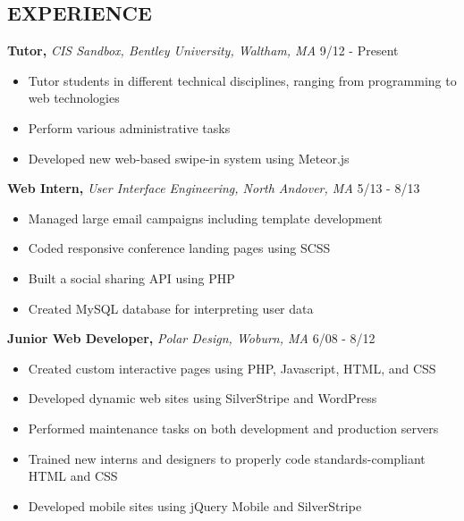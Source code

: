 \documentclass[line, margin]{res}
\begin{document}
\begin{resume}
 
\section{EXPERIENCE} 
\textbf{Tutor,} \textit{CIS Sandbox, Bentley University, Waltham, MA} \hfill 9/12 - Present
\begin{itemize}
    \item Tutor students in different technical disciplines, ranging from programming to web technologies
    \item Perform various administrative tasks
    \item Developed new web-based swipe-in system using Meteor.js
\end{itemize}
\textbf{Web Intern,} \textit{User Interface Engineering, North Andover, MA} \hfill 5/13 - 8/13
\begin{itemize}
    \item Managed large email campaigns including template development
    \item Coded responsive conference landing pages using SCSS
    \item Built a social sharing API using PHP
    \item Created MySQL database for interpreting user data
\end{itemize}
\textbf{Junior Web Developer,} \textit{Polar Design, Woburn, MA} \hfill 6/08 - 8/12
\begin{itemize}
    \item Created custom interactive pages using PHP, Javascript, HTML, and CSS
    \item Developed dynamic web sites using SilverStripe and WordPress
    \item Performed maintenance tasks on both development and production servers
    \item Trained new interns and designers to properly code standards-compliant HTML and CSS
    \item Developed mobile sites using jQuery Mobile and SilverStripe
\end{itemize}
 

\end{resume}
\end{document}
